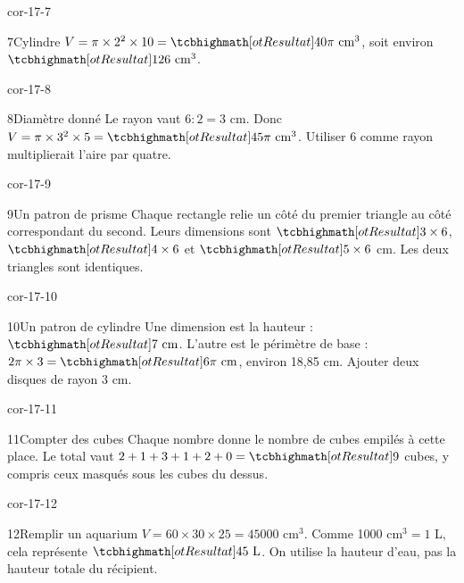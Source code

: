 \begin{blocLivre}{cor-17-7}\begin{corrige}{7}{Cylindre}
$V=\pi\times2^2\times10=\res{40\pi\ \mathrm{cm}^3}$, soit environ $\res{126\ \mathrm{cm}^3}$.
\label{fig-cor-17-7}
\end{corrige}\end{blocLivre}
\begin{blocLivre}{cor-17-8}\begin{corrige}{8}{Diamètre donné}
Le rayon vaut $6:2=3$ cm. Donc $V=\pi\times3^2\times5=\res{45\pi\ \mathrm{cm}^3}$. Utiliser 6 comme rayon multiplierait l’aire par quatre.
\label{fig-cor-17-8}
\end{corrige}\end{blocLivre}
\begin{blocLivre}{cor-17-9}\begin{corrige}{9}{Un patron de prisme}
Chaque rectangle relie un côté du premier triangle au côté correspondant du second. Leurs dimensions sont $\res{3\times6}$, $\res{4\times6}$ et $\res{5\times6}$ cm. Les deux triangles sont identiques.
\label{fig-cor-17-9}
\end{corrige}\end{blocLivre}
\begin{blocLivre}{cor-17-10}\begin{corrige}{10}{Un patron de cylindre}
Une dimension est la hauteur : $\res{7\ \mathrm{cm}}$. L’autre est le périmètre de base : $2\pi\times3=\res{6\pi\ \mathrm{cm}}$, environ 18,85 cm. Ajouter deux disques de rayon 3 cm.
\label{fig-cor-17-10}
\end{corrige}\end{blocLivre}
\begin{blocLivre}{cor-17-11}\begin{corrige}{11}{Compter des cubes}
Chaque nombre donne le nombre de cubes empilés à cette place. Le total vaut $2+1+3+1+2+0=\res9$ cubes, y compris ceux masqués sous les cubes du dessus.
\label{fig-cor-17-11}
\end{corrige}\end{blocLivre}
\begin{blocLivre}{cor-17-12}\begin{corrige}{12}{Remplir un aquarium}
$V=60\times30\times25=45000$ cm$^3$. Comme 1000 cm$^3=1$ L, cela représente $\res{45\ \mathrm L}$. On utilise la hauteur d’eau, pas la hauteur totale du récipient.
\label{fig-cor-17-12}
\end{corrige}\end{blocLivre}
